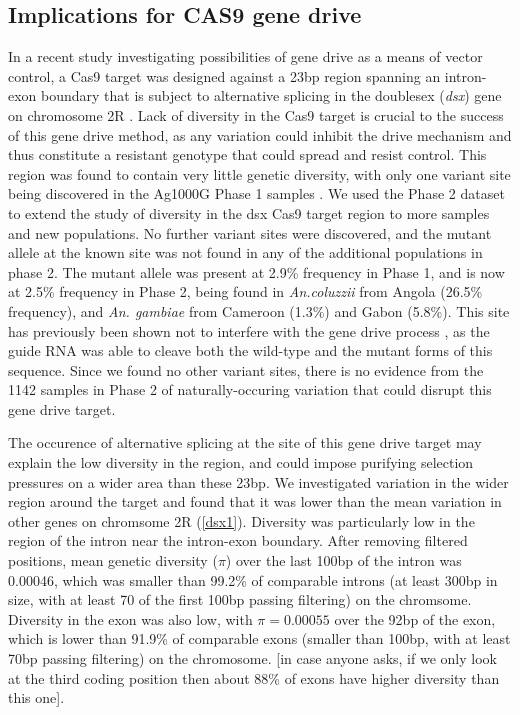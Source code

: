 \documentclass[a4paper,11pt,abstracton,hidelinks]{scrartcl}
\begin{document}
\subsection*{Implications for CAS9 gene drive}

In a recent study investigating possibilities of gene drive as a means of vector control, a Cas9 target was designed against a 23bp region spanning an intron-exon boundary that is subject to alternative splicing in the doublesex (\textit{dsx}) gene on chromosome 2R \cite{kyrou2018}.
%
Lack of diversity in the Cas9 target is crucial to the success of this gene drive method, as any variation could inhibit the drive mechanism and thus constitute a resistant genotype that could spread and resist control.
%
This region was found to contain very little genetic diversity, with only one variant site being discovered in the Ag1000G Phase 1 samples \cite{kyrou2018}.
%
We used the Phase 2 dataset to extend the study of diversity in the dsx Cas9 target region to more samples and new populations. 
%
No further variant sites were discovered, and the mutant allele at the known site was not found in any of the additional populations in phase 2.
%
The mutant allele was present at 2.9\% frequency in Phase 1, and is now at 2.5\% frequency in Phase 2, being found in \textit{An.coluzzii} from Angola (26.5\% frequency), and \textit{An. gambiae} from Cameroon (1.3\%) and Gabon (5.8\%).
%
This site has previously been shown not to interfere with the gene drive process \cite{kyrou2018}, as the guide RNA was able to cleave both the wild-type and the mutant forms of this sequence. 
%
Since we found no other variant sites, there is no evidence from the 1142 samples in Phase 2 of naturally-occuring variation that could disrupt this gene drive target. 

The occurence of alternative splicing at the site of this gene drive target may explain the low diversity in the region, and could impose purifying selection pressures on a wider area than these 23bp.
%
We investigated variation in the wider region around the target and found that it was lower than the mean variation in other genes on chromsome 2R (\ref{dsx1}). 
%
Diversity was particularly low in the region of the intron near the intron-exon boundary.
%
After removing filtered positions, mean genetic diversity ($\pi$) over the last 100bp of the intron was 0.00046, which was smaller than 99.2\% of comparable introns (at least 300bp in size, with at least 70 of the first 100bp passing filtering) on the chromsome.
%
Diversity in the exon was also low, with $\pi = 0.00055$ over the 92bp of the exon, which is lower than 91.9\% of comparable exons (smaller than 100bp, with at least 70bp passing filtering) on the chromosome. [in case anyone asks, if we only look at the third coding position then about 88\% of exons have higher diversity than this one].
\end{document}
